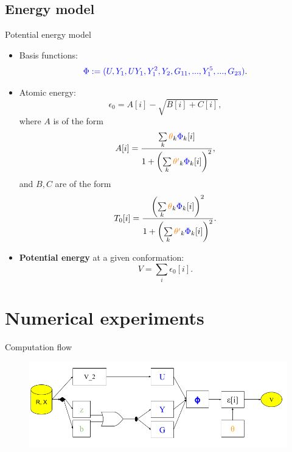 \documentclass{beamer}
\begin{document}
\subsection{Energy model}
\begin{frame}{Potential energy model}
    \fontsize{8.5}{6}\selectfont
    \begin{itemize}
        \item Basis functions:
        \begin{equation}
            {\color{blue}\Phi := (U, Y_1, UY_1, Y_1^2,Y_2,G_{11},...,Y_1^5,...,G_{23})}.
        \end{equation}
        \item Atomic energy:
        \begin{equation}
            \epsilon_0 = A[i] - \sqrt{B[i] + C[i]},
        \end{equation}
        where $A$ is of the form
        \begin{equation}
            A[i] = \frac{\sum\limits_k {\color{orange}\theta}_k {\color{blue}\Phi}_k[i]}{1 + \left(\sum\limits_k {\color{orange}\theta'}_k {\color{blue}\Phi}_k[i] \right)^2},
        \end{equation}
        and $B,C$ are of the form
        \begin{equation}
            T_0[i]  = \frac{\left(\sum\limits_k {\color{orange}\theta}_k {\color{blue}\Phi}_k[i]\right)^2}{1 + \left(\sum\limits_k {\color{orange}\theta'}_k {\color{blue}\Phi}_k[i] \right)^2}.
        \end{equation}
        \item \textbf{Potential energy} at a given conformation:
        \begin{equation}
            V = \sum_i \epsilon_0[i].
        \end{equation}
    \end{itemize}
\end{frame}


\section{Numerical experiments}
\begin{frame}{Computation flow}
    \begin{figure}[H]
        \centering
            \includegraphics[scale=0.4]{img/slide/Computation flow.png}
        \label{fig:computation_flow}
    \end{figure}
\end{frame}
\end{document}
